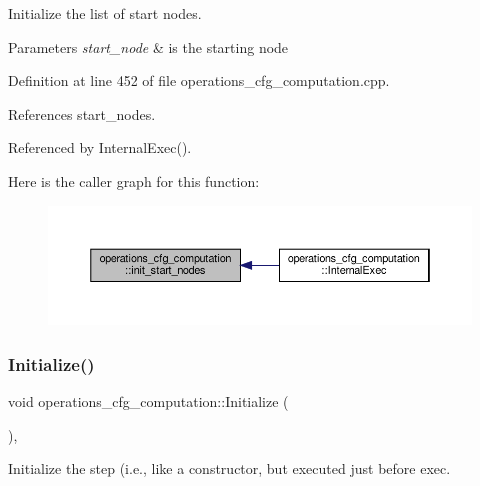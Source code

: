 Initialize the list of start nodes. 


\begin{DoxyParams}{Parameters}
{\em start\+\_\+node} & is the starting node \\
\hline
\end{DoxyParams}


Definition at line 452 of file operations\+\_\+cfg\+\_\+computation.\+cpp.



References start\+\_\+nodes.



Referenced by Internal\+Exec().

Here is the caller graph for this function\+:
\nopagebreak
\begin{figure}[H]
\begin{center}
\leavevmode
\includegraphics[width=350pt]{d0/d11/classoperations__cfg__computation_ae1d29037a601f373f5d8db0faed1ffbf_icgraph}
\end{center}
\end{figure}
\mbox{\label{classoperations__cfg__computation_ae89b6b5ecac95fdcb9e84ee9bbf527f5}} 
\subsubsection{\texorpdfstring{Initialize()}{Initialize()}}
{\footnotesize\ttfamily void operations\+\_\+cfg\+\_\+computation\+::\+Initialize (\begin{DoxyParamCaption}{ }\end{DoxyParamCaption})\hspace{0.3cm}{\ttfamily [override]}, {\ttfamily [virtual]}}



Initialize the step (i.\+e., like a constructor, but executed just before exec. 




